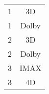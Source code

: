 \documentclass[12pt]{article}
\begin{document}
\begin{enumerate}
\begin{itemize}
\begin{center}
\begin{tabular}{c c}
                    \hline
                    1 & 3D \\
                    1 & Dolby \\
                    2 & 3D \\
                    2 & Dolby \\
                    3 & IMAX \\
                    3 & 4D  \\
                    \hline
                  \end{tabular}
                \end{center}
        \end{itemize}
\end{enumerate}
\end{document}
